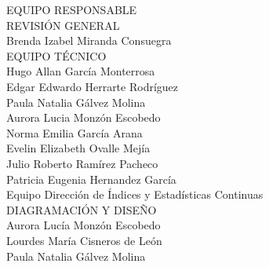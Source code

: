{\Bold \LARGE EQUIPO RESPONSABLE}\\[2cm]
{\Bold \large \color{color1!89!black} REVISIÓN GENERAL}\\[0.2cm]
Brenda Izabel Miranda Consuegra\\[0.8cm]
{\Bold \large \color{color1!89!black} EQUIPO TÉCNICO}\\[0.2cm]
Hugo Allan García Monterrosa\\
Edgar Edwardo Herrarte Rodríguez\\
Paula Natalia Gálvez Molina\\
Aurora Lucia Monzón Escobedo\\
Norma Emilia García Arana\\
Evelin Elizabeth Ovalle Mejía\\
Julio Roberto Ramírez Pacheco \\
Patricia Eugenia Hernandez García\\
Equipo Dirección de Índices y Estadísticas Continuas\\[0.8cm]
{\Bold \large \color{color1!89!black} DIAGRAMACIÓN Y DISEÑO}\\[0.2cm]
Aurora Lucía Monzón Escobedo\\
Lourdes María Cisneros de León\\
Paula Natalia Gálvez Molina\\[0.8cm]
